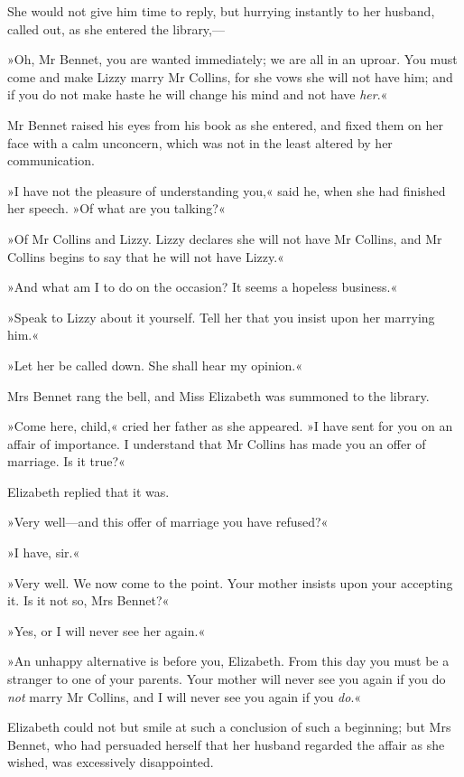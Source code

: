 She would not give him time to reply, but hurrying instantly to her husband, called out, as she entered the library,—

»Oh, Mr Bennet, you are wanted immediately; we are all in an uproar. You must come and make Lizzy marry Mr Collins, for she vows she will not have him; and if you do not make haste he will change his mind and not have \textit{her}.«

Mr Bennet raised his eyes from his book as she entered, and fixed them on her face with a calm unconcern, which was not in the least altered by her communication.

»I have not the pleasure of understanding you,« said he, when she had finished her speech. »Of what are you talking?«

»Of Mr Collins and Lizzy. Lizzy declares she will not have Mr Collins, and Mr Collins begins to say that he will not have Lizzy.«

»And what am I to do on the occasion? It seems a hopeless business.«

»Speak to Lizzy about it yourself. Tell her that you insist upon her marrying him.«

»Let her be called down. She shall hear my opinion.«

Mrs Bennet rang the bell, and Miss Elizabeth was summoned to the library.

»Come here, child,« cried her father as she appeared. »I have sent for you on an affair of importance. I understand that Mr Collins has made you an offer of marriage. Is it true?«

Elizabeth replied that it was.

»Very well—and this offer of marriage you have refused?«

»I have, sir.«

»Very well. We now come to the point. Your mother insists upon your accepting it. Is it not so, Mrs Bennet?«

»Yes, or I will never see her again.«

»An unhappy alternative is before you, Elizabeth. From this day you must be a stranger to one of your parents. Your mother will never see you again if you do \textit{not} marry Mr Collins, and I will never see you again if you \textit{do}.«

Elizabeth could not but smile at such a conclusion of such a beginning; but Mrs Bennet, who had persuaded herself that her husband regarded the affair as she wished, was excessively disappointed.

